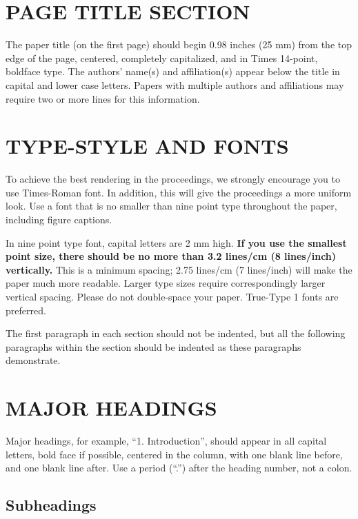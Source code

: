 \documentclass[a4paper,10pt,oneside]{article}
\begin{document}
\begin{sloppy}
\section{PAGE TITLE SECTION}
\label{sec:pagestyle}

The paper title (on the first page) should begin 0.98 inches (25 mm) from the top edge of the page, centered, completely capitalized, and in Times 14-point, boldface type. The authors' name(s) and affiliation(s) appear below the title in capital and lower case letters. Papers with multiple authors and affiliations may require two or more lines for this information.

\section{TYPE-STYLE AND FONTS}
\label{sec:typestyle}

To achieve the best rendering in the proceedings, we strongly encourage you to use Times-Roman font. In addition, this will give the proceedings a more uniform look. Use a font that is no smaller than nine point type throughout the paper, including figure captions.

In nine point type font, capital letters are 2 mm high. {\bf If you use the smallest point size, there should be no more than 3.2 lines/cm (8 lines/inch) vertically.} This is a minimum spacing; 2.75 lines/cm (7 lines/inch) will make the paper much more readable. Larger type sizes require correspondingly larger vertical spacing. Please do not double-space your paper. True-Type 1 fonts are preferred.

The first paragraph in each section should not be indented, but all the following paragraphs within the section should be indented as these paragraphs demonstrate.

\section{MAJOR HEADINGS}
\label{sec:majhead}

Major headings, for example, ``1. Introduction'', should appear in all capital letters, bold face if possible, centered in the column, with one blank line before, and one blank line after. Use a period (``.'') after the heading number, not a colon.

\subsection{Subheadings}
\label{ssec:subhead}


\end{sloppy}
\end{document}
